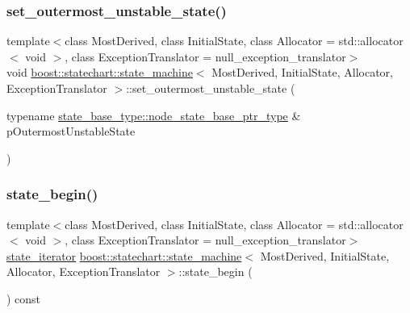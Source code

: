 \subsubsection{\texorpdfstring{set\+\_\+outermost\+\_\+unstable\+\_\+state()}{set\_outermost\_unstable\_state()}}
{\footnotesize\ttfamily template$<$class Most\+Derived, class Initial\+State, class Allocator = std\+::allocator$<$ void $>$, class Exception\+Translator = null\+\_\+exception\+\_\+translator$>$ \\
void \mbox{\hyperlink{classboost_1_1statechart_1_1state__machine}{boost\+::statechart\+::state\+\_\+machine}}$<$ Most\+Derived, Initial\+State, Allocator, Exception\+Translator $>$\+::set\+\_\+outermost\+\_\+unstable\+\_\+state (\begin{DoxyParamCaption}\item[{typename \mbox{\hyperlink{classboost_1_1statechart_1_1detail_1_1state__base_a8e3dd0f80bf95d7df21417a50f1dbaa1}{state\+\_\+base\+\_\+type\+::node\+\_\+state\+\_\+base\+\_\+ptr\+\_\+type}} \&}]{p\+Outermost\+Unstable\+State }\end{DoxyParamCaption})\hspace{0.3cm}{\ttfamily [inline]}}

\mbox{\label{classboost_1_1statechart_1_1state__machine_a270c21248c558be7daf8139c032b1f0c}} 
\subsubsection{\texorpdfstring{state\+\_\+begin()}{state\_begin()}}
{\footnotesize\ttfamily template$<$class Most\+Derived, class Initial\+State, class Allocator = std\+::allocator$<$ void $>$, class Exception\+Translator = null\+\_\+exception\+\_\+translator$>$ \\
\mbox{\hyperlink{classboost_1_1statechart_1_1state__machine_1_1state__iterator}{state\+\_\+iterator}} \mbox{\hyperlink{classboost_1_1statechart_1_1state__machine}{boost\+::statechart\+::state\+\_\+machine}}$<$ Most\+Derived, Initial\+State, Allocator, Exception\+Translator $>$\+::state\+\_\+begin (\begin{DoxyParamCaption}{ }\end{DoxyParamCaption}) const\hspace{0.3cm}{\ttfamily [inline]}}

